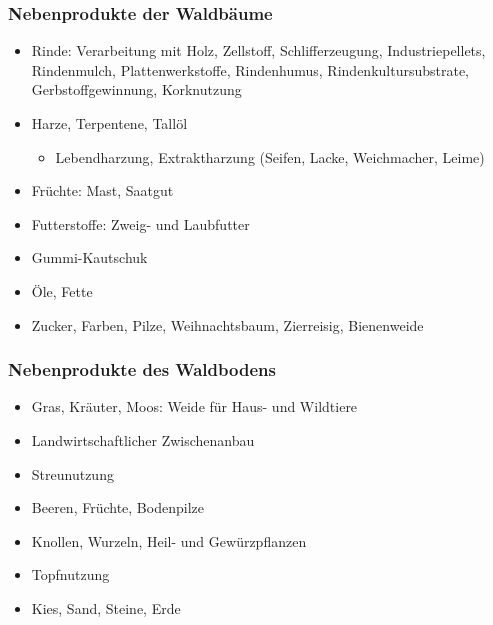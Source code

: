 \documentclass[12pt]{article}
\begin{document}
\subsubsection{Nebenprodukte der Waldbäume}
\begin{itemize}
  \item Rinde: Verarbeitung mit Holz, Zellstoff, Schlifferzeugung,
  Industriepellets, Rindenmulch, Plattenwerkstoffe, Rindenhumus,
  Rindenkultursubstrate, Gerbstoffgewinnung, Korknutzung
  \item Harze, Terpentene, Tallöl
  \begin{itemize}
    \item Lebendharzung, Extraktharzung (Seifen, Lacke, Weichmacher, Leime)
    \end{itemize}
  \item Früchte: Mast, Saatgut
  \item Futterstoffe: Zweig- und Laubfutter
  \item Gummi-Kautschuk
  \item Öle, Fette
  \item Zucker, Farben, Pilze, Weihnachtsbaum, Zierreisig, Bienenweide
\end{itemize}

\subsubsection{Nebenprodukte des Waldbodens}
\begin{itemize}
  \item Gras, Kräuter, Moos: Weide für Haus- und Wildtiere
  \item Landwirtschaftlicher Zwischenanbau
  \item Streunutzung
  \item Beeren, Früchte, Bodenpilze
  \item Knollen, Wurzeln, Heil- und Gewürzpflanzen
  \item Topfnutzung
  \item Kies, Sand, Steine, Erde
\end{itemize}
\end{document}
